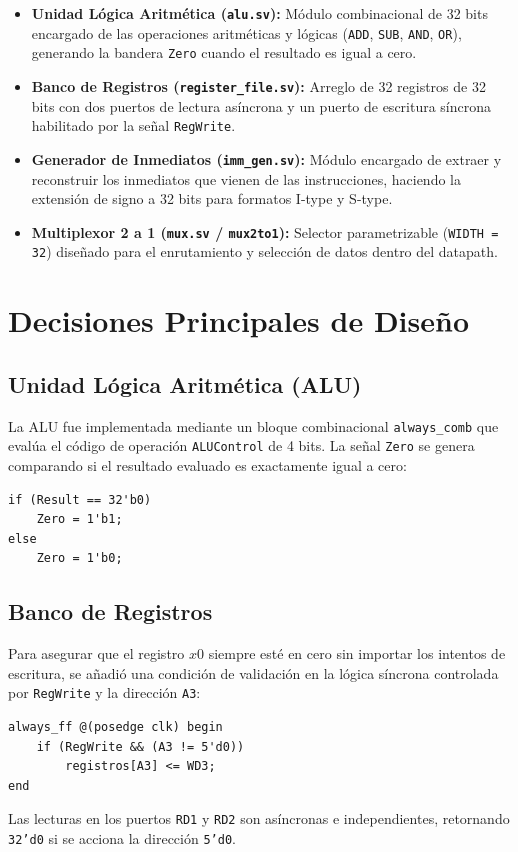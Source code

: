 \documentclass[12pt,a4paper]{article}
\begin{document}
\begin{itemize}
    \item \textbf{Unidad Lógica Aritmética (\texttt{alu.sv}):} Módulo combinacional de 32 bits encargado de las operaciones aritméticas y lógicas (\texttt{ADD}, \texttt{SUB}, \texttt{AND}, \texttt{OR}), generando la bandera \texttt{Zero} cuando el resultado es igual a cero.
    \item \textbf{Banco de Registros (\texttt{register\_file.sv}):} Arreglo de 32 registros de 32 bits con dos puertos de lectura asíncrona y un puerto de escritura síncrona habilitado por la señal \texttt{RegWrite}.
    \item \textbf{Generador de Inmediatos (\texttt{imm\_gen.sv}):} Módulo encargado de extraer y reconstruir los inmediatos que vienen de las instrucciones, haciendo la extensión de signo a 32 bits para formatos I-type y S-type.
    \item \textbf{Multiplexor 2 a 1 (\texttt{mux.sv} / \texttt{mux2to1}):} Selector parametrizable (\texttt{WIDTH = 32}) diseñado para el enrutamiento y selección de datos dentro del datapath.
\end{itemize}

\section{Decisiones Principales de Diseño}

\subsection{Unidad Lógica Aritmética (ALU)}
La ALU fue implementada mediante un bloque combinacional \texttt{always\_comb} que evalúa el código de operación \texttt{ALUControl} de 4 bits. La señal \texttt{Zero} se genera comparando si el resultado evaluado es exactamente igual a cero:
\begin{verbatim}
if (Result == 32'b0)
    Zero = 1'b1;
else
    Zero = 1'b0;
\end{verbatim}

\subsection{Banco de Registros}
Para asegurar que el registro $x0$ siempre esté en cero sin importar los intentos de escritura, se añadió una condición de validación en la lógica síncrona controlada por \texttt{RegWrite} y la dirección \texttt{A3}:
\begin{verbatim}
always_ff @(posedge clk) begin
    if (RegWrite && (A3 != 5'd0))
        registros[A3] <= WD3;
end
\end{verbatim}
Las lecturas en los puertos \texttt{RD1} y \texttt{RD2} son asíncronas e independientes, retornando \texttt{32'd0} si se acciona la dirección \texttt{5'd0}.
\end{document}
